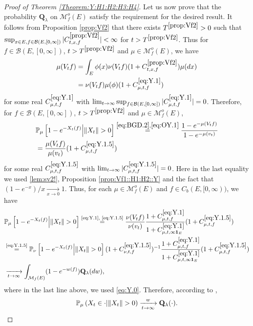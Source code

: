 \documentclass[12pt,a4paper]{amsart}
\numberwithin{equation}{section}
\theoremstyle{plain}
\theoremstyle{definition}
\theoremstyle{remark}
\begin{document}
\begin{proof}[Proof of Theorem \ref{Theorem:Y:H1:H2:H3:H4}]
	Let us now prove that the probability $\mathbf Q_\lambda$ on $\mathcal M_f^o(E)$ satisfy the requirement for the desired result. 
	It follows from Proposition \ref{prop:Vf2} that there exists $T^{\ref{prop:Vf2}}>0$ such that $\sup_{x\in E, f \in \mathcal B(E,[0,\infty])} |C^{\ref{prop:Vf2}}_{t,x,f}|< \infty$ for $t>T^{\ref{prop:Vf2}}$.
	Thus for $f \in \mathcal B(E,[0,\infty])$, $t>T^{\ref{prop:Vf2}}$ and $\mu \in \mathcal M_f^o(E)$, we have
\begin{align}
	\mu(V_tf)
	&= \int_E  \phi(x) \nu (V_tf) (1+C^{\ref{prop:Vf2}}_{t,x,f})\mu(dx)
	\\ \label{eq:Y.1} & = \nu(V_tf) \mu(\phi)(1+ C^{\eqref{eq:Y.1}}_{\mu,t,f})
\end{align}
	for some real $C^{\eqref{eq:Y.1}}_{\mu,t,f}$ with
	$\lim_{t\to \infty} \sup_{f \in \mathcal B(E,[0,\infty])}
	|C^{\eqref{eq:Y.1}}_{\mu,t,f}| = 0$.
	Therefore, for $f\in \mathcal B(E,[0,\infty])$,
	$t > T^{\ref{prop:Vf2}}$ and $\mu \in \mathcal M_f^o(E)$,
\begin{align}
	&\mathbb P_\mu \left[1 - e^{-X_t(f)} \middle|\|X_t\|>0\right]
	\overset{\eqref{eq:BGD.2},\eqref{eq:OY.1}}= \frac{1 - e^{- \mu(V_tf)}} {1 - e^{-\mu(v_t)}}
	\\\label{eq:Y.1.5}& = \frac{ \mu(V_t f) }{ \mu(v_t) } (1+C^{\eqref{eq:Y.1.5}}_{\mu,t,f})
\end{align}
	for some real $C^{\eqref{eq:Y.1.5}}_{\mu,t,f}$ with $\lim_{t\to \infty} |C^{\eqref{eq:Y.1.5}}_{\mu,t,f}| = 0$.
	Here in the last equality we used \eqref{lem:sv2!}, Proposition \ref{prop:Vf1::H1:H2::Y} and the fact that $(1-e^{-x})/x \xrightarrow[x\to 0]{}1$.
	Thus, for each $\mu \in \mathcal M^o_f(E)$ and $f\in C_b(E,[0,\infty))$, we have
\begin{align}
&\mathbb P_\mu \left[1 - e^{-X_t(f)} \middle|\|X_t\|>0\right]
	 \overset{\text{\eqref{eq:Y.1}, \eqref{eq:Y.1.5}}}= \frac{ \nu(V_tf) }{ \nu(v_t) } \frac{1+C^{\eqref{eq:Y.1}}_{\mu,t,f}}{1+C^{\eqref{eq:Y.1}}_{\mu, t,\infty \mathbf 1_E}}(1+ C^{\eqref{eq:Y.1.5}}_{\mu,t,f})
	\\& \overset{\text{\eqref{eq:Y.1.5}}}= \mathbb P_\nu \left[1 - e^{-X_t(f)} \middle| \|X_t\|>0\right](1+C^{\eqref{eq:Y.1.5}}_{\nu, t,f})^{-1}  \frac{1+C^{\eqref{eq:Y.1}}_{\mu,t,f}}{1+C^{\eqref{eq:Y.1}}_{\mu,  t,\infty \mathbf 1_E}}(1+ C^{\eqref{eq:Y.1.5}}_{\mu,t,f})
	\\&\xrightarrow[t\to \infty]{} \int_{\mathcal M_f(E)}(1-e^{-w(f)}) \mathbf Q_\lambda(dw),
\end{align}
	where in the last line above, we used \eqref{eq:Y.0}.
	Therefore, according to \cite[Theorem 1.18]{Li2011MeasureValued},
	\[\mathbb P_\mu\left(X_t \in \cdot \middle| \|X_t\|>0\right)
	\xrightarrow[t\to \infty]{w}
	\mathbf Q_\lambda(\cdot). \qedhere\]
\end{proof}
\end{document}

